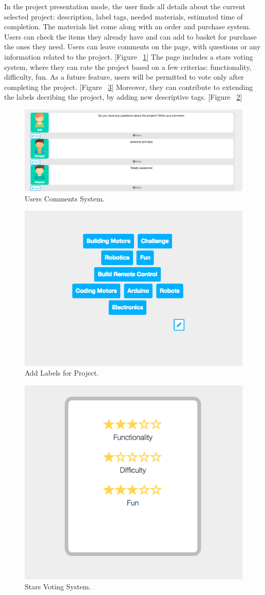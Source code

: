 In the project presentation mode, the user finds all details about the current selected project: description, label tags, needed materials, estimated time of completion. The materials list come along with an order and purchase system. Users can check the items they already have and can add to basket for purchase the ones they need. 
Users can leave comments on the page, with questions or any information related to the project. [Figure ~\ref{fig:comments}] The page includes a stars voting system, where they can rate the project based on a few criterias: functionality, difficulty, fun. As a future feature, users will be permitted to vote only after completing the project. [Figure ~\ref{fig:stars_voting_system}] Moreover, they can contribute to extending the labels decribing the project, by adding new descriptive tags. [Figure ~\ref{fig:add_labels}] \\

\begin{figure}
\includegraphics[width=1\linewidth]{images/ui/Comments.png}
\caption{Users Comments System.}
\label{fig:comments}
\end{figure}

\begin{figure}
\includegraphics[width=0.5\linewidth]{images/ui/AddLabels.png}
\caption{Add Labels for Project.}
\label{fig:add_labels}
\end{figure}

\begin{figure}
\includegraphics[width=0.5\linewidth]{images/ui/StarsVotingSystem.png}
\caption{Stars Voting System.}
\label{fig:stars_voting_system}
\end{figure}

